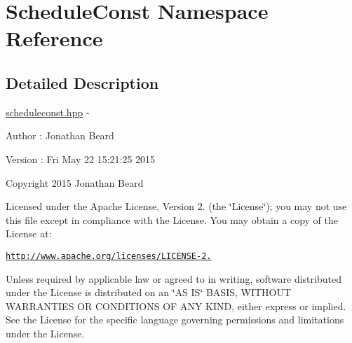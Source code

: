 \hypertarget{namespace_schedule_const}{}\section{Schedule\+Const Namespace Reference}
\label{namespace_schedule_const}


\subsection{Detailed Description}
\hyperlink{scheduleconst_8hpp_source}{scheduleconst.\+hpp} -\/ \begin{DoxyAuthor}{Author}
\+: Jonathan Beard 
\end{DoxyAuthor}
\begin{DoxyVersion}{Version}
\+: Fri May 22 15\+:21\+:25 2015
\end{DoxyVersion}
Copyright 2015 Jonathan Beard

Licensed under the Apache License, Version 2. (the \char`\"{}\+License\char`\"{}); you may not use this file except in compliance with the License. You may obtain a copy of the License at\+:

\href{http://www.apache.org/licenses/LICENSE-2.0}{\tt http\+://www.\+apache.\+org/licenses/\+L\+I\+C\+E\+N\+S\+E-\/2.}

Unless required by applicable law or agreed to in writing, software distributed under the License is distributed on an \char`\"{}\+A\+S I\+S\char`\"{} B\+A\+S\+IS, W\+I\+T\+H\+O\+UT W\+A\+R\+R\+A\+N\+T\+I\+ES OR C\+O\+N\+D\+I\+T\+I\+O\+NS OF A\+NY K\+I\+ND, either express or implied. See the License for the specific language governing permissions and limitations under the License. 